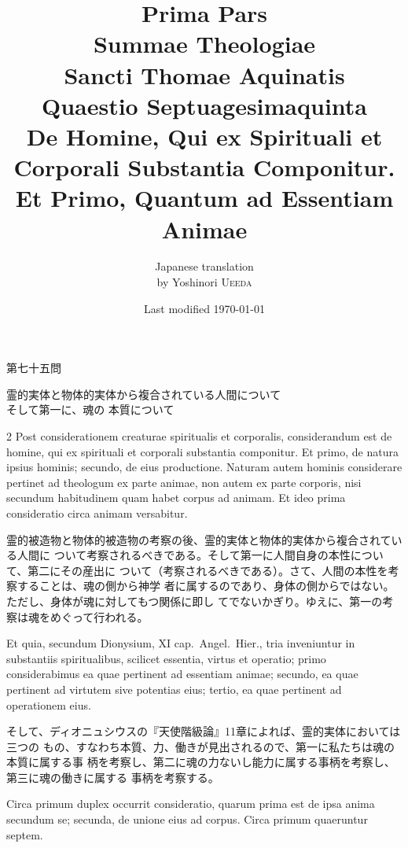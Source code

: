 \documentclass[paper=a4paper,fontsize=10pt,jafontsize=9pt,titlepage]{jlreq}
\title{{\bfseries Prima Pars}\\{\Huge Summae Theologiae}\\Sancti Thomae
Aquinatis\\{\sffamily Quaestio Septuagesimaquinta}\\{\bfseries De Homine,
Qui ex Spirituali et Corporali Substantia Componitur.\\ Et Primo,
Quantum ad Essentiam Animae}}
\author{Japanese translation\\by Yoshinori {\scshape Ueeda}}
\date{Last modified \today}
\begin{document}
\maketitle
\tableofcontents
\newpage
\begin{center}
 {\Large 第七十五問}
\end{center} 
 \vspace{1em}
\begin{center}
 {\Large 霊的実体と物体的実体から複合されている人間について\\そして第一に、魂の
 本質について}
\end{center}

\vspace{2em}


\begin{paracol}{2}
Post considerationem creaturae spiritualis et corporalis,
considerandum est de homine, qui ex spirituali et corporali substantia
componitur. Et primo, de natura ipsius hominis; secundo, de eius
productione. Naturam autem hominis considerare pertinet ad theologum
ex parte animae, non autem ex parte corporis, nisi secundum
habitudinem quam habet corpus ad animam. Et ideo prima consideratio
circa animam versabitur. 

\switchcolumn

霊的被造物と物体的被造物の考察の後、霊的実体と物体的実体から複合されている人間に
ついて考察されるべきである。そして第一に人間自身の本性について、第二にその産出に
ついて（考察されるべきである）。さて、人間の本性を考察することは、魂の側から神学
者に属するのであり、身体の側からではない。ただし、身体が魂に対してもつ関係に即し
てでないかぎり。ゆえに、第一の考察は魂をめぐって行われる。

\switchcolumn

Et quia, secundum Dionysium, XI cap.~Angel.~Hier., tria inveniuntur in
substantiis spiritualibus, scilicet essentia, virtus et operatio; primo
considerabimus ea quae pertinent ad essentiam animae; secundo, ea quae pertinent
ad virtutem sive potentias eius; tertio, ea quae pertinent ad operationem eius.


\switchcolumn


 そして、ディオニュシウスの『天使階級論』11章によれば、霊的実体においては三つの
 もの、すなわち本質、力、働きが見出されるので、第一に私たちは魂の本質に属する事
 柄を考察し、第二に魂の力ないし能力に属する事柄を考察し、第三に魂の働きに属する
 事柄を考察する。


\switchcolumn

 Circa primum duplex occurrit consideratio, quarum prima est de ipsa anima
 secundum se; secunda, de unione eius ad corpus. Circa primum quaeruntur septem.


\end{paracol}
\end{document}
